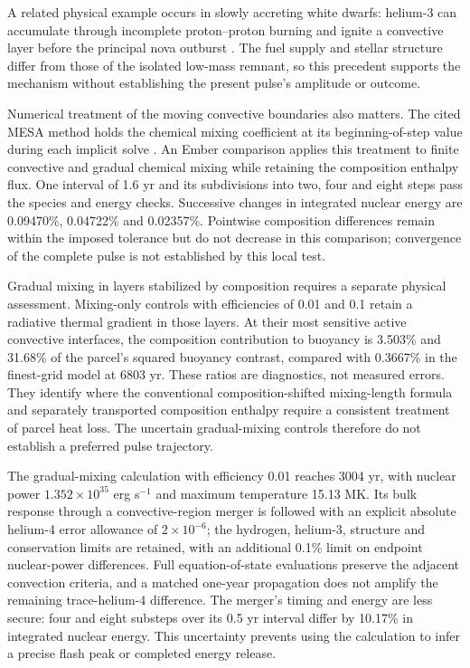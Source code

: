 \documentclass[11pt,letterpaper]{article}
\begin{document}
A related physical example occurs in slowly accreting white dwarfs: helium-3
can accumulate through incomplete proton--proton burning and ignite a convective
layer before the principal nova outburst \cite{denissenkov13}. The fuel supply
and stellar structure differ from those of the isolated low-mass remnant, so
this precedent supports the mechanism without establishing the present pulse's
amplitude or outcome.

Numerical treatment of the moving convective boundaries also matters.
The cited MESA method holds the chemical mixing coefficient at its
beginning-of-step value during each implicit solve \cite{paxton11}.
An Ember comparison applies this treatment to finite convective and gradual
chemical mixing while retaining the composition enthalpy flux. One interval
of 1.6 yr and its subdivisions into two, four and eight steps pass the
species and energy checks. Successive changes in integrated nuclear energy
are 0.09470\%, 0.04722\% and 0.02357\%. Pointwise composition differences
remain within the imposed tolerance but do not decrease in this comparison;
convergence of the complete pulse is not established by this local test.

Gradual mixing in layers stabilized by composition requires a separate
physical assessment. Mixing-only controls with efficiencies of 0.01 and 0.1
retain a radiative thermal gradient in those layers. At their most sensitive
active convective interfaces, the composition contribution to buoyancy is
3.503\% and 31.68\% of the parcel's squared buoyancy contrast, compared with
0.3667\% in the finest-grid model at 6803 yr. These ratios are diagnostics,
not measured errors. They identify where the conventional composition-shifted
mixing-length formula and separately transported composition enthalpy require
a consistent treatment of parcel heat loss. The uncertain gradual-mixing
controls therefore do not establish a preferred pulse trajectory.

The gradual-mixing calculation with efficiency 0.01 reaches 3004 yr,
with nuclear power $1.352\times10^{35}$ erg s$^{-1}$ and maximum
temperature 15.13 MK. Its bulk response through a convective-region merger
is followed with an explicit absolute helium-4 error allowance of
$2\times10^{-6}$; the hydrogen, helium-3, structure and conservation limits
are retained, with an additional 0.1\% limit on endpoint nuclear-power
differences. Full equation-of-state evaluations preserve the adjacent
convection criteria, and a matched one-year propagation does not amplify
the remaining trace-helium-4 difference. The merger's timing and energy
are less secure: four and eight substeps over its 0.5 yr interval differ
by 10.17\% in integrated nuclear energy. This uncertainty prevents using
the calculation to infer a precise flash peak or completed energy release.
\end{document}

